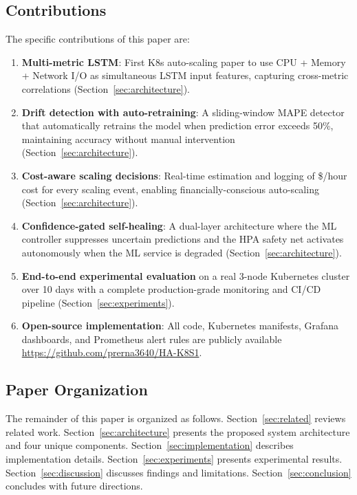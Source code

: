 \documentclass[journal]{IEEEtran}
\begin{document}
\subsection{Contributions}
The specific contributions of this paper are:
\begin{enumerate}
    \item \textbf{Multi-metric LSTM}: First K8s auto-scaling paper to use CPU + Memory + Network I/O as simultaneous LSTM input features, capturing cross-metric correlations (Section~\ref{sec:architecture}).
    \item \textbf{Drift detection with auto-retraining}: A sliding-window MAPE detector that automatically retrains the model when prediction error exceeds 50\%, maintaining accuracy without manual intervention (Section~\ref{sec:architecture}).
    \item \textbf{Cost-aware scaling decisions}: Real-time estimation and logging of \$/hour cost for every scaling event, enabling financially-conscious auto-scaling (Section~\ref{sec:architecture}).
    \item \textbf{Confidence-gated self-healing}: A dual-layer architecture where the ML controller suppresses uncertain predictions and the HPA safety net activates autonomously when the ML service is degraded (Section~\ref{sec:architecture}).
    \item \textbf{End-to-end experimental evaluation} on a real 3-node Kubernetes cluster over 10 days with a complete production-grade monitoring and CI/CD pipeline (Section~\ref{sec:experiments}).
    \item \textbf{Open-source implementation}: All code, Kubernetes manifests, Grafana dashboards, and Prometheus alert rules are publicly available \url{https://github.com/prerna3640/HA-K8S1}.
\end{enumerate}

\subsection{Paper Organization}
The remainder of this paper is organized as follows. Section~\ref{sec:related} reviews related work. Section~\ref{sec:architecture} presents the proposed system architecture and four unique components. Section~\ref{sec:implementation} describes implementation details. Section~\ref{sec:experiments} presents experimental results. Section~\ref{sec:discussion} discusses findings and limitations. Section~\ref{sec:conclusion} concludes with future directions.
\end{document}
